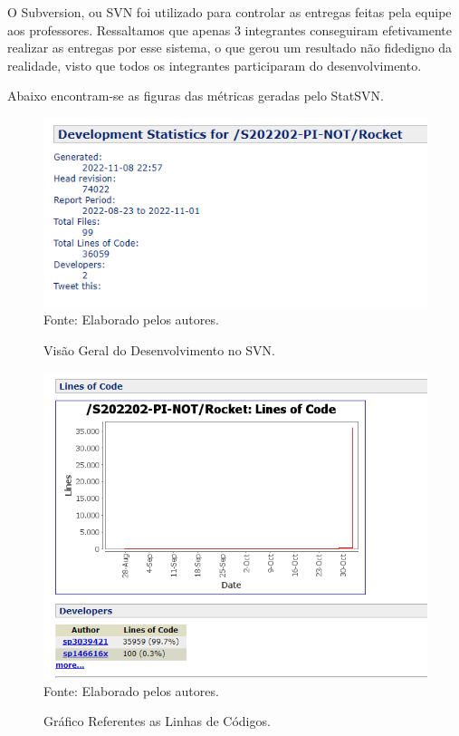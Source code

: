 \documentclass[
    12pt,               %
    openright,          %
    oneside,
    a4paper,            %
    BIBLATEX,           %
    TODO,               %
    english,            %
    brazil              %
    ]{ifsp-spo-inf-ctds}
\begin{document}
    O Subversion, ou SVN foi utilizado para controlar as entregas feitas pela equipe aos professores. Ressaltamos que apenas 3 integrantes conseguiram efetivamente realizar as entregas por esse sistema, o que gerou um resultado não fidedigno da realidade, visto que todos os integrantes participaram do desenvolvimento. 
    
    Abaixo encontram-se as figuras das métricas geradas pelo StatSVN.
    
    \begin{figure}[H]
                \centering
                \caption{Visão Geral do Desenvolvimento no SVN.}
                \includegraphics[width=1 \textwidth]{StatSVN/StatDesenvolvimento.png}
                {\footnotesize Fonte: Elaborado pelos autores.}
                \label{fig:desenvolvimentoSVN}
            \end{figure}
    
    \begin{figure}[H]
                \centering
                \caption{Gráfico Referentes as Linhas de Códigos.}
                \includegraphics[width=1 \textwidth]{StatSVN/linha de codigo autor.png}
                {\footnotesize Fonte: Elaborado pelos autores.}
                \label{fig:linhaCod}
            \end{figure}
    
\end{document}
